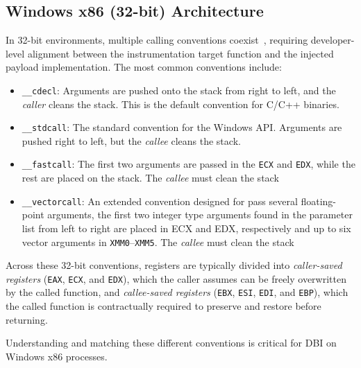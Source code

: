 \subsection{Windows x86 (32-bit) Architecture}
In 32-bit environments, multiple calling conventions coexist~\cite{doc:msvc_x86_calling_conventions}, requiring developer-level alignment between the instrumentation target function and the injected payload implementation.
The most common conventions include:
\begin{itemize}
	\item \texttt{\_\_cdecl}: Arguments are pushed onto the stack from right to left, and the \emph{caller} cleans the stack.
	This is the default convention for C/C++ binaries.
	\item \texttt{\_\_stdcall}: The standard convention for the Windows \ac{API}.
	Arguments are pushed right to left, but the \emph{callee} cleans the stack.
	\item \texttt{\_\_fastcall}: The first two arguments are passed in the \texttt{ECX} and \texttt{EDX}, while the rest are placed on the stack. The \emph{callee} must clean the stack
	\item \texttt{\_\_vectorcall}: An extended convention designed for pass several floating-point arguments, the first two integer type arguments found in the parameter list from left to right are placed in ECX and EDX, respectively and up to six vector arguments in \texttt{XMM0}--\texttt{XMM5}. The \emph{callee} must clean the stack
	
\end{itemize}
Across these 32-bit conventions, registers are typically divided into \emph{caller-saved registers} (\texttt{EAX}, \texttt{ECX}, and \texttt{EDX}), which the caller assumes can be freely overwritten by the called function, and \emph{callee-saved registers} (\texttt{EBX}, \texttt{ESI}, \texttt{EDI}, and \texttt{EBP}), which the called function is contractually required to preserve and restore before returning.

Understanding and matching these different conventions is critical for \ac{DBI} on Windows x86 processes.


